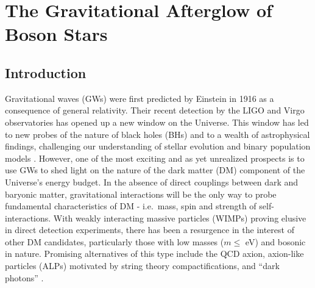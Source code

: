 



\section{The Gravitational Afterglow of Boson Stars}
\subsection{Introduction} \label{ag:sect:intro2}



Gravitational waves (GWs) were first predicted by Einstein in 1916 as
a consequence of general relativity.  Their recent detection by the
LIGO and Virgo observatories has opened up a new window on the
Universe. This window has led to new probes of the nature of black holes
(BHs) and to a wealth of astrophysical findings, challenging our
understanding of stellar evolution and binary population models \cite{LIGOScientific:2016aoc,LIGOScientific:2018jsj,LIGOScientific:2020kqk,LIGOScientific:2021psn}.
However, one of the most exciting and as yet unrealized prospects is
to use GWs to shed light on the nature of the dark matter (DM)
component of the Universe's energy budget. In the absence of direct
couplings between dark and baryonic matter, gravitational interactions will be the only way to
probe fundamental characteristics of DM - i.e.~mass, spin and strength
of self-interactions.  With weakly interacting massive particles (WIMPs)
proving elusive in direct detection experiments, there has been a resurgence in the interest of other DM
candidates, particularly those with low masses ($m \leq $ eV) and bosonic in nature.
Promising alternatives of this type include the QCD axion, axion-like particles
(ALPs) motivated by string theory compactifications, and ``dark
photons'' \cite{Arkani-Hamed:2008hhe,Feng:2010gw,Marsh:2015xka,Svrcek:2006yi,Kim:1986ax,Arvanitaki:2009fg,Ringwald:2012cu,Wilczek:1977pj,Peccei:1977hh,Weinberg:1977ma}.

